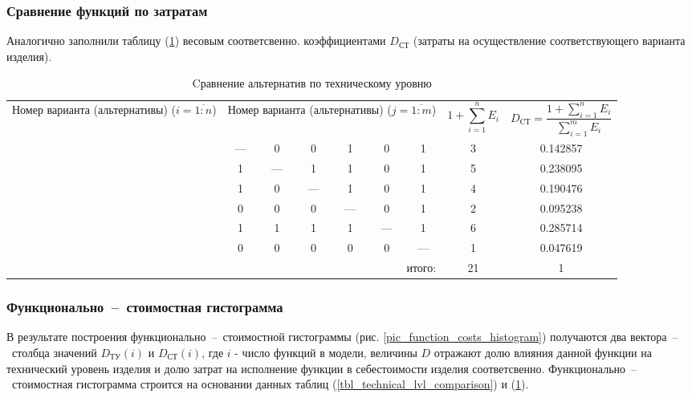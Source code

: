 \subsubsection{Сравнение функций по затратам}
Аналогично заполнили таблицу (\ref{tbl_costs_lvl_comparison}) весовым соответсвенно.
коэффициентами $D_\text{СТ}$ (затраты на осуществление соответствующего варианта
изделия).
\begin{table}[ht!]
    \centering
    \begin{tabular}{|c|c|c|c|c|c|c|c|c|}
        \hline
        \multirow{2}{2.4cm}{
            \centering
            Номер варианта (альтернативы) ($i = \overline{1:n}$)
        } &
        \multicolumn{6}{c|}{
            \parbox[t]{2.4cm}{
                \centering
                Номер варианта (альтернативы) ($j = \overline{1:m}$)
            }
        } &
        \multirow{2}{1.7cm}[0pt]{
            \centering
            $$1 + \sum_{i=1}^n E_i$$
        } &
        \multirow{2}{3.2cm}{
            \centering
            $$ D_\text{CТ} = \frac{1 + \sum_{i=1}^n E_i}{\sum_{i=1}^m E_i}$$
        } \\
        &
        \centering{1} &
        \centering{2} &
        \centering{3} &
        \centering{4} &
        \centering{5} &
        \centering{6} & & \\
        \hline \hline
        \centering{1} &---& 0 & 0 & 1 & 0 & 1 & 3 & 0.142857 \\ \hline
        \centering{2} & 1 &---& 1 & 1 & 0 & 1 & 5 & 0.238095 \\ \hline
        \centering{3} & 1 & 0 &---& 1 & 0 & 1 & 4 & 0.190476 \\ \hline
        \centering{4} & 0 & 0 & 0 &---& 0 & 1 & 2 & 0.095238 \\ \hline
        \centering{5} & 1 & 1 & 1 & 1 &---& 1 & 6 & 0.285714 \\ \hline
        \centering{6} & 0 & 0 & 0 & 0 & 0 &---& 1 & 0.047619 \\ \hline
        \hline
        \multicolumn{7}{|r|}{итого:} & 21 & 1 \\
        \hline
    \end{tabular}
    \caption{Cравнение альтернатив по техническому уровню}
    \label{tbl_costs_lvl_comparison}
\end{table}


\subsubsection{Функционально~--~стоимостная гистограмма}
В результате построения функционально~--~стоимостной гистограммы
(рис. \ref{pic_function_costs_histogram}) получаются два вектора~--~столбца
значений $D_\text{ТУ}(i)$ и $D_\text{СТ}(i)$, где $i$ - число функций в модели,
величины $D$ отражают долю влияния данной функции на технический уровень изделия
и долю затрат на исполнение функции в себестоимости изделия соответсвенно.
Функционально~--~стоимостная гистограмма строится на основании данных таблиц
(\ref{tbl_technical_lvl_comparison}) и (\ref{tbl_costs_lvl_comparison}).

